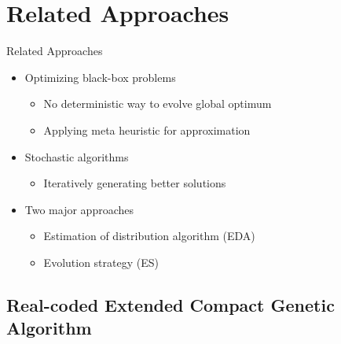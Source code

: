 \section{Related Approaches}
\begin{frame}{Related Approaches}
  \begin{itemize}
    \item Optimizing black-box problems
      \begin{itemize}
        \item No deterministic way to evolve global optimum
        \item Applying meta heuristic for approximation
      \end{itemize}
      \vspace*{14pt}
    \item Stochastic algorithms
      \begin{itemize}
        \item Iteratively generating better solutions
      \end{itemize}
      \vspace*{14pt}
    \item Two major approaches
      \begin{itemize}
        \item Estimation of distribution algorithm (EDA)
        \item Evolution strategy (ES)
      \end{itemize}
  \end{itemize}
\end{frame}

\subsection{Real-coded Extended Compact Genetic Algorithm}


